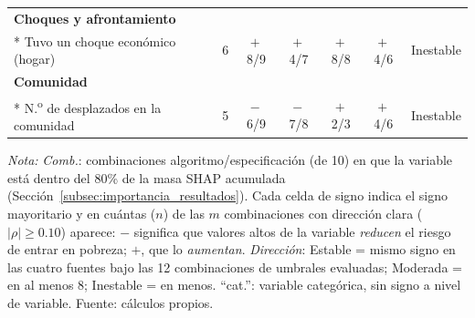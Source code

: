 {\begin{longtable}{lcccccc}
    \addlinespace
    \textbf{Choques y afrontamiento} & & & & & & \\*
    \quad Tuvo un choque económico (hogar) & 6 & $+$\,8/9 & $+$\,4/7 & $+$\,8/8 & $+$\,4/6 & Inestable \\
    \addlinespace
    \textbf{Comunidad} & & & & & & \\*
    \quad N.\textsuperscript{o} de desplazados en la comunidad & 5 & $-$\,6/9 & $-$\,7/8 & $+$\,2/3 & $+$\,4/6 & Inestable \\
\end{longtable}
\vspace{-\LTpost}
{\footnotesize \textit{Nota:} \emph{Comb.}: combinaciones
algoritmo/especificación (de 10) en que la variable está dentro del
80\% de la masa SHAP acumulada
(Sección~\ref{subsec:importancia_resultados}). Cada celda de signo
indica el signo mayoritario y en cuántas ($n$) de las $m$
combinaciones con dirección clara ($|\rho|\geq 0.10$) aparece: $-$
significa que valores altos de la variable \emph{reducen} el riesgo
de entrar en pobreza; $+$, que lo \emph{aumentan}.
\emph{Dirección}: Estable = mismo signo en las cuatro fuentes bajo
las 12 combinaciones de umbrales evaluadas; Moderada = en al menos 8;
Inestable = en menos. ``cat.'': variable categórica, sin signo a nivel
de variable.
Fuente: cálculos propios.\par}
}